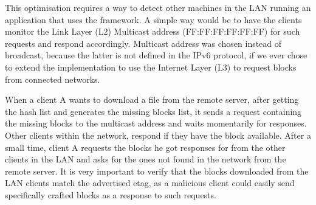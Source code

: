 This optimisation requires a way to detect other machines in the LAN running an application that uses the framework. A simple way would be to have the clients monitor the Link Layer (L2) Multicast address (FF:FF:FF:FF:FF:FF) for such requests and respond accordingly. Multicast address was chosen instead of broadcast, because the latter is not defined in the IPv6 protocol, if we ever chose to extend the implementation to use the Internet Layer (L3) to request blocks from connected networks.

When a client A wants to download a file from the remote server, after getting the hash list and generates the missing blocks list, it sends a request containing the missing blocks to the multicast address and waits momentarily for responses. Other clients within the network, respond if they have the block available. After a small time, client A requests the blocks he got responses for from the other clients in the LAN and asks for the ones not found in the network from the remote server. It is very important to verify that the blocks downloaded from the LAN clients match the advertised etag, as a malicious client could easily send specifically crafted blocks as a response to such requests.